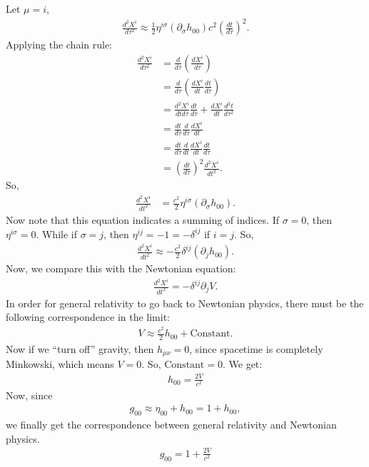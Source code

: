\documentclass{article}
\theoremstyle{definition}
\begin{document}
Let $\mu = i$,
\begin{align*}
\frac{d^2X^i}{d\tau^2} \approx \frac{1}{2}\eta^{i\sigma}\left(\partial_\sigma h_{00}\right)c^2\left(\frac{dt}{d\tau} \right)^2. 
\end{align*}
Applying the chain rule:
\begin{align*}
\frac{d^2X^i}{d\tau^2} &= \frac{d}{d\tau}\left(\frac{dX^i}{d\tau} \right) \\
&= \frac{d}{d\tau}\left(\frac{dX^i}{dt}\frac{dt}{d\tau} \right)  \\
&= \frac{d^2X^i}{dtd\tau}\frac{dt}{d\tau} + \frac{dX^i}{dt}\frac{d^2t}{d\tau^2}\\
&= \frac{dt}{d\tau}\frac{d}{d\tau}\frac{dX^i}{dt}\\
&= \frac{dt}{d\tau}\frac{d}{dt}\frac{dX^i}{dt}\frac{dt}{d\tau}\\
&= \left( \frac{dt}{d\tau}\right)^2\frac{d^2X^i}{dt^2}.
\end{align*}
So,
\begin{align*}
\frac{d^2X^i}{dt^2} &= \frac{c^2}{2}\eta^{i\sigma}\left(\partial_\sigma h_{00} \right). 
\end{align*}
Now note that this equation indicates a summing of indices. If $\sigma = 0$, then $\eta^{i\sigma} = 0$. While if $\sigma = j$, then $\eta^{ij} = -1 = -\delta^{ij}$ if $i=j$. So,
\begin{align*}
\frac{d^2X^i}{dt^2} \approx -\frac{c^2}{2}\delta^{ij}\left(\partial_j h_{00} \right).
\end{align*}
Now, we compare this with the Newtonian equation:
\begin{align*}
\frac{d^2X^i}{dt^2} = -\delta^{ij}\partial_jV.
\end{align*}
In order for general relativity to go back to Newtonian physics, there must be the following correspondence in the limit:
\begin{align*}
V \approx \frac{c^2}{2}h_{00} + \text{Constant}.
\end{align*}
Now if we ``turn off'' gravity, then $h_{\mu\nu} = 0$, since spacetime is completely Minkowski, which means $V = 0$. So, $\text{Constant} = 0$. We get:
\begin{align*}
\boxed{h_{00} = \frac{2V}{c^2}}
\end{align*} 
Now, since 
\begin{align*}
g_{00} \approx \eta_{00} + h_{00} = 1 + h_{00},
\end{align*}
we finally get the correspondence between general relativity and Newtonian physics. 
\begin{align*}
\boxed{g_{00} = 1 + \frac{2V}{c^2}}
\end{align*}
\end{document}
